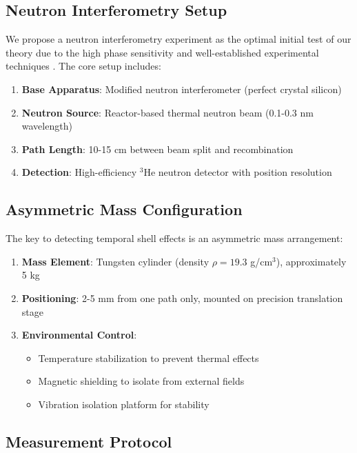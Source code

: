 \documentclass[12pt,a4paper]{article}
\begin{document}
\subsection{Neutron Interferometry Setup}

We propose a neutron interferometry experiment as the optimal initial test of our theory due to the high phase sensitivity and well-established experimental techniques \citep{neutron, atominterferometry}. The core setup includes:

\begin{enumerate}
    \item \textbf{Base Apparatus}: Modified neutron interferometer (perfect crystal silicon)
    \item \textbf{Neutron Source}: Reactor-based thermal neutron beam (0.1-0.3 nm wavelength)
    \item \textbf{Path Length}: 10-15 cm between beam split and recombination
    \item \textbf{Detection}: High-efficiency $^3$He neutron detector with position resolution
\end{enumerate}

\subsection{Asymmetric Mass Configuration}

The key to detecting temporal shell effects is an asymmetric mass arrangement:

\begin{enumerate}
    \item \textbf{Mass Element}: Tungsten cylinder (density $\rho = 19.3$ g/cm$^3$), approximately 5 kg
    \item \textbf{Positioning}: 2-5 mm from one path only, mounted on precision translation stage
    \item \textbf{Environmental Control}:
    \begin{itemize}
        \item Temperature stabilization to prevent thermal effects
        \item Magnetic shielding to isolate from external fields
        \item Vibration isolation platform for stability
    \end{itemize}
\end{enumerate}

\subsection{Measurement Protocol}
\end{document}
